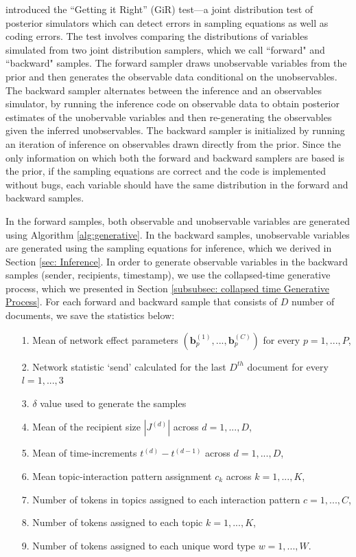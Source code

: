 \documentclass[a4paper]{article}
\begin{document}
   \cite{geweke2004getting} introduced the ``Getting it Right'' (GiR) test---a joint distribution test of posterior simulators which can detect errors in sampling equations as well as coding errors.  The test involves comparing the distributions of variables simulated from two joint distribution samplers, which we call ``forward" and ``backward" samples. The forward sampler draws unobservable variables from the prior and then generates the observable data conditional on the unobservables. The backward sampler alternates between the inference and an observables simulator, by running the inference code on observable data to obtain posterior estimates of the unobervable variables and then re-generating the observables given the inferred unobservables. The backward sampler is initialized by running an iteration of inference on observables drawn directly from the prior. Since the only information on which both the forward and backward samplers are based is the prior, if the sampling equations are correct and the code is implemented without bugs, each variable should have the same distribution in the forward and backward samples.
   
In the forward samples, both observable and unobservable variables are generated using Algorithm \ref{alg:generative}. In the backward samples, unobservable variables are generated using the sampling equations for inference, which we derived in Section \ref{sec: Inference}. In order to generate observable variables in the backward samples (sender, recipients, timestamp), we use the collapsed-time generative process, which we presented in Section \ref{subsubsec: collapsed time Generative Process}.  For each forward and backward sample that consists of $D$ number of documents, we save the statistics below:
      \begin{itemize}
      	\item[1.] Mean of network effect parameters $(\boldsymbol{b}_p^{(1)},...,\boldsymbol{b}_p^{(C)})$ for every $p = 1,...,P$,
      	      	\item[2.] Network statistic `send' calculated for the last $D^{th}$ document for every $l=1,...,3$
      	      	\item[3.] $\delta$ value used to generate the samples
      	      	\item[4.] Mean of the recipient size $|J^{(d)}|$ across $d=1,...,D$,
      	\item[5.] Mean of time-increments $t^{(d)}-t^{(d-1)}$ across $d=1,...,D$,
      	\item[6.] Mean topic-interaction pattern assignment $c_k$ across $k=1,...,K$, 
      	\item[7.] Number of tokens in topics assigned to each interaction pattern $c=1,...,C$,
      	\item[8.] Number of tokens assigned to each topic $k=1,...,K$, 
       \item[9.] Number of tokens assigned to each unique word type $w=1,...,W$.
      	      \end{itemize}
      	      
\end{document}
